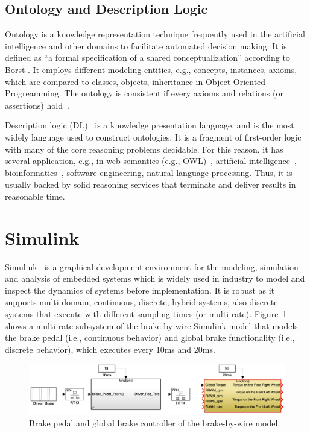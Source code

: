 \subsection*{Ontology and Description Logic}
Ontology is a knowledge representation technique frequently used in the artificial intelligence and other domains to facilitate automated decision making. It is defined as ``a formal specification of a shared conceptualization'' according to Borst \cite{Borst1997ConstructionOntologies}. It employs different modeling entities, e.g., concepts, instances, axioms, which are compared to classes, objects, inheritance in Object-Oriented Progreamming. The ontology is consistent if every axioms and relations (or assertions) hold~\cite{Mankovskii2009OWL:Language}.

Description logic (DL)~\cite{Baader2010TheApplications} is a knowledge presentation language, and is the most widely language used to construct ontologies. It is a fragment of first-order logic with many of the core reasoning problems decidable. For this reason, it has several application, e.g., in web semantics (e.g., OWL)~\cite{conf/owled/ShearerMH08}, artificial intelligence~\cite{10.1007/978-94-017-9297-4_7}, bioinformatics~\cite{Rector2006}, software engineering, natural language processing. Thus, it is usually backed by solid reasoning services that terminate and deliver results in reasonable time. 

\section{Simulink}
Simulink~\cite{JamesB.Dabney2003MasteringSimulink} is a graphical development environment for the modeling, simulation and analysis of embedded systems which is widely used in industry to model and inspect the dynamics of systems before implementation. It is robust as it supports multi-domain, continuous, discrete, hybrid systems, also discrete systems that execute with different sampling times (or multi-rate). Figure~\ref{fig_sm_multi-rate} shows a multi-rate subsystem of the brake-by-wire Simulink model that models the brake pedal (i.e., continuous behavior) and global brake functionality (i.e., discrete behavior), which executes every 10ms and 20ms.  
\begin{figure}[h]
	\centering
	\includegraphics[width=0.9\linewidth]{images/sm}
	\caption{Brake pedal and global brake controller of the brake-by-wire model.}
	\label{fig_sm_multi-rate}
\end{figure}

